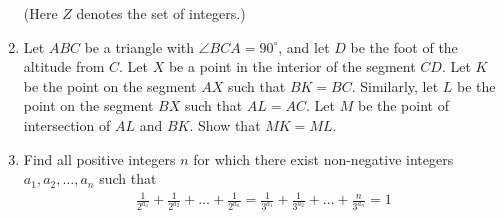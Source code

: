 \documentclass{article}
\begin{document}
\begin{enumerate}
		(Here $Z$ denotes the set of integers.)
	\item  Let $ABC$ be a triangle with $\angle{BCA}=90^{\circ}$, and let $D$ be the foot of the altitude from $C$. Let $X$ be a point in the interior of the segment $CD$. Let $K$ be the point on the segment $AX$ such that $BK = BC$. Similarly, let $L$ be the point on the segment $BX$ such that $AL=AC$. Let $M$ be the point of intersection of $AL$ and $BK$.
		Show that $MK=ML$.
	\item  Find all positive integers $n$ for which there exist non-negative integers $a_{1}, a_{2}, \dots, a_{n}$ such that
		\begin{align}
			\frac{1}{2^{a_{1}}}+\frac{1}{2^{a_{2}}}+ \dots +\frac{1}{2^{a_{n}}}=\frac{1}{3^{a_{1}}}+\frac{1}{3^{a_{2}}}+ \dots +\frac{n}{3^{a_{n}}}=1
		\end{align}
\end{enumerate}
\end{document}
